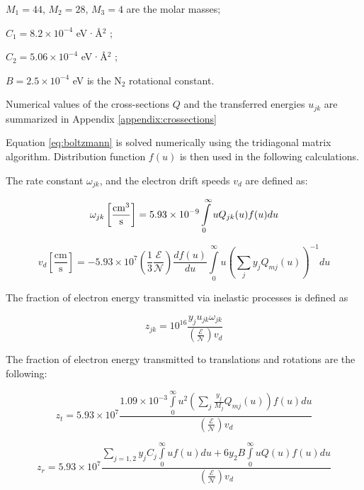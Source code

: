 $M_1=44$, $M_2=28$, $M_3=4$ are the molar masses;

$C_1 = 8.2 \times 10^{-4}$ eV·Å$^2$ \cite{Hake-1967};

$C_2 = 5.06 \times 10^{-4}$ eV·Å$^2$ \cite{Frost-1962};

$B = 2.5 \times 10^{-4}$ eV is the N$_2$ rotational constant.

Numerical values of the cross-sections $Q$ and the transferred energies $u_{jk}$ are summarized in Appendix \ref{appendix:crossections} 

Equation \ref{eq:boltzmann} is solved numerically using the tridiagonal matrix algorithm. Distribution function $f(u)$ is then used in the following calculations.

The rate constant $\omega_{jk}$, and the electron drift speeds $v_d$ are defined as:

\begin{equation}\label{eq:omega_jk}
\omega _{jk}\left[\frac{\rm{cm}^3}{\text{s}} \right] = 5.93 \times 10^{-9}\int\limits_0^\infty u Q_{jk}(u)f(u)du
\end{equation}
     
\begin{equation}\label{eq:v_d}
v_d \left[ \frac{\text{cm}}{\text{s}} \right] =  - 5.93 \times 10^7 \left( \frac{1}{3}\frac{\mathcal{E}}{\mathcal{N}} \right)\frac{df(u)}{du} \int\limits_0^\infty u \left( \sum\limits_j y_j Q_{mj}(u) \right)^{-1} du
\end{equation}

The fraction of electron energy transmitted via inelastic processes is defined as

\begin{equation}\label{eq:z_jk}
z_{jk} = 10^{16} \frac{y_j u_{jk} \omega _{jk}} {\left( \frac{\mathcal{E}}{\mathcal{N}} \right) v_d}   
\end{equation}

The fraction of electron energy transmitted to translations and rotations are the following:

\begin{equation}\label{eq:z_t}
z_t = 5.93 \times 10^7 \frac{1.09 \times 10^{-3} \int\limits_0^\infty u^2 \left( \sum\limits_j \frac{y_j}{M_j} Q_{mj}(u) \right)f(u)du} {\left( \frac{\mathcal{E}}{\mathcal{N}} \right) v_d}
\end{equation}

\begin{equation}\label{eq:z_r}
z_r = 5.93 \times 10^7 \frac{\sum\limits_{j=1,2} y_j C_j \int\limits_0^\infty uf(u)du + 6 y_2 B \int\limits_0^\infty u Q(u) f(u) du} {\left( \frac{\mathcal{E}}{\mathcal{N}} \right) v_d} 
\end{equation}

